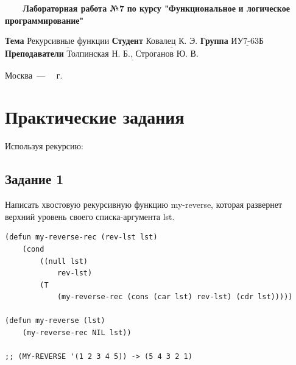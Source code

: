 \documentclass[a4paper,14pt, unknownkeysallowed]{extreport}
\begin{document}
\begin{titlepage}
	
	\begin{center}
		\noindent\begin{minipage}{1.3\textwidth}\centering
		\Large\textbf{   ~~~ Лабораторная работа №7}\newline
		\textbf{по курсу "Функциональное}\newline
		\textbf{и логическое программирование"}\newline\newline\newline
		\end{minipage}
	\end{center}
	
	\noindent\textbf{Тема} 			$\underline{\text{Рекурсивные функции}}$\newline\newline
	\noindent\textbf{Студент} 		$\underline{\text{Ковалец К. Э.}}$\newline\newline
	\noindent\textbf{Группа} 		$\underline{\text{ИУ7-63Б}}$\newline\newline
	\noindent\textbf{Преподаватели} $\underline{\text{Толпинская Н. Б., Строганов Ю. В.}}$\newline
	
	\begin{center}
		\vfill
		Москва~---~\the\year
		~г.
	\end{center}
	\restoregeometry
\end{titlepage}



\setcounter{page}{2}

\chapter{Практические задания}

Используя рекурсию:

\section{Задание 1}

Написать хвостовую рекурсивную функцию my-reverse, которая развернет верхний уровень своего списка-аргумента lst.

\begin{center}
\captionsetup{justification=raggedright,singlelinecheck=off}
\begin{lstlisting}[label=lst:parallel_processing,caption=Решение задания 1]
(defun my-reverse-rec (rev-lst lst)
    (cond 
        ((null lst)
            rev-lst)
        (T 
            (my-reverse-rec (cons (car lst) rev-lst) (cdr lst)))))

(defun my-reverse (lst)
    (my-reverse-rec NIL lst))

;; (MY-REVERSE '(1 2 3 4 5)) -> (5 4 3 2 1)
\end{lstlisting}
\end{center}
\end{document}
